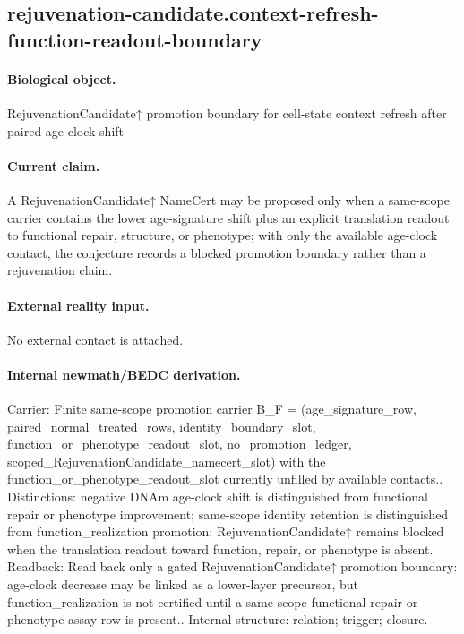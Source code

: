 \subsection{rejuvenation-candidate.context-refresh-function-readout-boundary}

\paragraph{Biological object.} RejuvenationCandidate↑ promotion boundary for cell-state context refresh after paired age-clock shift

\paragraph{Current claim.} A RejuvenationCandidate↑ NameCert may be proposed only when a same-scope carrier contains the lower age-signature shift plus an explicit translation readout to functional repair, structure, or phenotype; with only the available age-clock contact, the conjecture records a blocked promotion boundary rather than a rejuvenation claim.

\paragraph{External reality input.}
No external contact is attached.

\paragraph{Internal newmath/BEDC derivation.} Carrier: Finite same-scope promotion carrier B\_F = (age\_signature\_row, paired\_normal\_treated\_rows, identity\_boundary\_slot, function\_or\_phenotype\_readout\_slot, no\_promotion\_ledger, scoped\_RejuvenationCandidate\_namecert\_slot) with the function\_or\_phenotype\_readout\_slot currently unfilled by available contacts.. Distinctions: negative DNAm age-clock shift is distinguished from functional repair or phenotype improvement; same-scope identity retention is distinguished from function\_realization promotion; RejuvenationCandidate↑ remains blocked when the translation readout toward function, repair, or phenotype is absent. Readback: Read back only a gated RejuvenationCandidate↑ promotion boundary: age-clock decrease may be linked as a lower-layer precursor, but function\_realization is not certified until a same-scope functional repair or phenotype assay row is present.. Internal structure: relation; trigger; closure.

